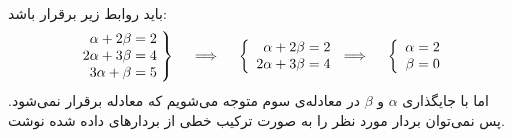 \\
باید روابط زیر برقرار باشد:
\begin{align*}
    \left.\begin{array}{r@{\mskip\thickmuskip}l}
      \alpha + 2\beta = 2\\
      2\alpha + 3\beta = 4\\
      3\alpha + \beta = 5
    \end{array} \right\}
    \quad \implies \quad
    \left\{\begin{array}{r@{\mskip\thickmuskip}l}
        \alpha + 2\beta = 2\\
        2\alpha + 3\beta = 4
    \end{array}\right.
    \implies \quad
    \left\{\begin{array}{r@{\mskip\thickmuskip}l}
        \alpha = 2\\
        \beta = 0
    \end{array}\right.
\end{align*}
اما با جایگذاری
$\alpha$
و
$\beta$
در معادله‌ی سوم متوجه می‌شویم که معادله برقرار نمی‌شود. پس نمی‌توان بردار مورد نظر را به صورت
ترکیب خطی از بردار‌های داده شده نوشت.